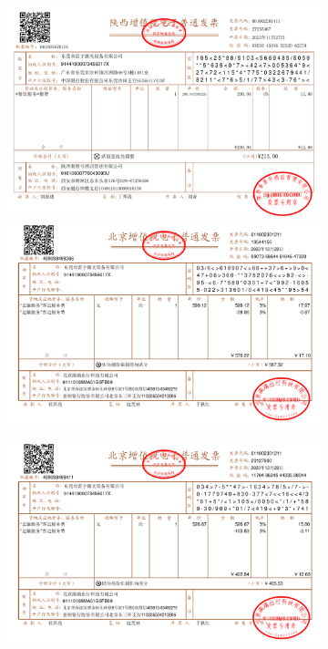 \documentclass[a4paper]{article}
\begin{document}
	\begin{figure}
		\centering %
		\begin{subfigure}{0.95\linewidth}
			\includegraphics[width=\linewidth]{software/7}
			\includegraphics[width=\linewidth]{software/8}
		\end{subfigure}
	\end{figure} 
	
	\begin{figure}
		\centering %
		\begin{subfigure}{0.95\linewidth}
			\includegraphics[width=\linewidth]{software/9}
		\end{subfigure}
	\end{figure} 
\end{document}
